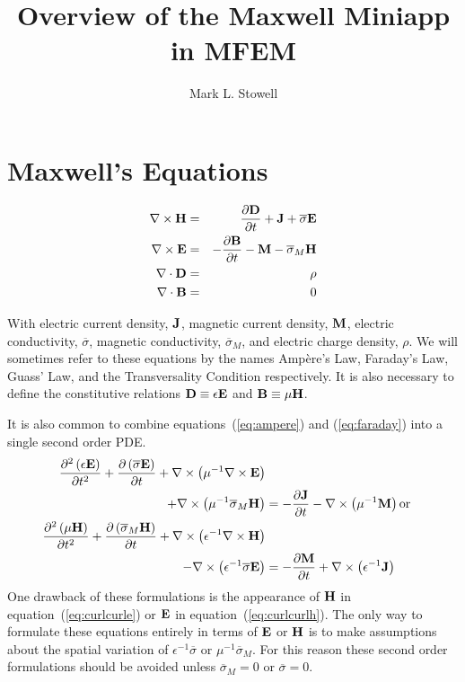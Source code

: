 \documentclass[12pt]{article}
\title{Overview of the Maxwell Miniapp in MFEM}
\author{Mark L. Stowell}
\providecommand{\B}{\mbox{\bf B}}
\providecommand{\E}{\mbox{\bf E}}
\providecommand{\D}{\mbox{\bf D}}
\renewcommand{\H}{\mbox{\bf H}}
\providecommand{\J}{\mbox{\bf J}}
\providecommand{\M}{\mbox{\bf M}}
\providecommand{\sE}{\overline{\sigma}}
\providecommand{\sM}{\overline{\sigma}_M}
\newcommand{\refEq}[1]{(\ref{eq:#1})}
\newcommand{\Div}{\nabla\cdot}
\newcommand{\Curl}{\nabla\times}
\begin{document}
\maketitle

\section{Maxwell's Equations}

\begin{eqnarray}
\Curl\H & = &  \frac{\partial\D}{\partial t} + \J + \sE\E\label{eq:ampere}\\
\Curl\E & = & -\frac{\partial\B}{\partial t} - \M - \sM\H\label{eq:faraday}\\
\Div\D & = & \rho\label{eq:gauss}\\
\Div\B & =  & 0\label{eq:trans}
\end{eqnarray}

With electric current density, $\J$, magnetic current density,
$\M$, electric conductivity, $\sE$, magnetic
conductivity, $\sM$, and electric charge density,
$\rho$. We will sometimes refer to these equations by the names
Amp\`ere's Law, Faraday's Law, Guass' Law, and the Transversality
Condition respectively. It is also necessary to define the constitutive
relations $\D\equiv\epsilon\E$ and
$\B\equiv\mu\H$.

It is also common to combine equations~\refEq{ampere} and
\refEq{faraday} into a single second order PDE.
\begin{align}
\frac{\partial^2\left(\epsilon\E\right)}{\partial t^2}
+ \frac{\partial\left(\sE\E\right)}{\partial t}
+ \Curl\left(\mu^{-1}\Curl\E\right) & \nonumber \\
+ \Curl\left(\mu^{-1}\sM\H\right) &
=
-\frac{\partial\J}{\partial t}
- \Curl\left(\mu^{-1}\M\right)
\label{eq:curlcurle}
\mbox{or}&\\
\frac{\partial^2\left(\mu\H\right)}{\partial t^2}
+ \frac{\partial\left(\sM\H\right)}{\partial t}
+ \Curl\left(\epsilon^{-1}\Curl\H\right) & \nonumber \\
- \Curl\left(\epsilon^{-1}\sE\E\right) &
=
-\frac{\partial\M}{\partial t}
+\Curl\left(\epsilon^{-1}\J\right)
\label{eq:curlcurlh}
\end{align}
One drawback of these formulations is the appearance of $\H$ in
equation~\refEq{curlcurle} or $\E$ in equation~\refEq{curlcurlh}. The
only way to formulate these equations entirely in terms of $\E$ or
$\H$ is to make assumptions about the spatial variation of
$\epsilon^{-1}\sE$ or $\mu^{-1}\sM$. For this reason these second
order formulations should be avoided unless $\sM=0$ or $\sE=0$.
\end{document}
